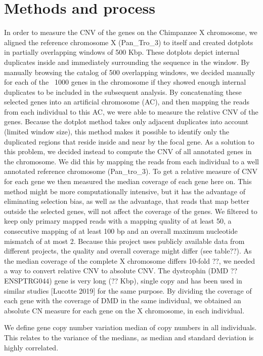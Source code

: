 \section*{Methods and process}
In order to measure the CNV of the genes on the Chimpanzee X chromosome, we aligned the reference chromosome X (Pan\_Tro\_3) to itself and created dotplots in partially overlapping windows of 500 Kbp. These dotplots depict internal duplicates inside and immediately surrounding the sequence in the window. By manually browsing the catalog of 500 overlapping windows, we decided manually for each of the ~1000 genes in the chromosome if they showed enough internal duplicates to be included in the subsequent analysis. By concatenating these selected genes into an artificial chromosome (AC), and then mapping the reads from each individual to this AC, we were able to measure the relative CNV of the genes. Because the dotplot method takes only adjacent duplicates into account (limited window size), this method makes it possible to identify only the duplicated regions that reside inside and near by the focal gene. As a solution to this problem, we decided instead to compute the CNV of all annotated genes in the chromosome. We did this by mapping the reads from each individual to a well annotated reference chromosome (Pan\_tro\_3). To get a relative measure of CNV for each gene we then measured the median coverage of each gene here on. This method might be more computationally intensive, but it has the advantage of eliminating selection bias, as well as the advantage, that reads that map better outside the selected genes, will not affect the coverage of the genes. We filtered to keep only primary mapped reads with a mapping quality of at least 50, a consecutive mapping of at least 100 bp and an overall maximum nucleotide mismatch of at most 2. Because this project uses publicly available data from different projects, the quality and overall coverage might differ (see table??). As the median coverage of the complete X chromosome differs 10-fold ??, we needed a way to convert relative CNV to absolute CNV. The dystrophin (DMD ??ENSPTRG{0}44) gene is very long (?? Kbp), single copy and has been used in similar studies [Lucotte 2019] for the same purpose. By dividing the coverage of each gene with the coverage of DMD in the same individual, we obtained an absolute CN measure for each gene on the X chromosome, in each individual. 

We define gene copy number variation median of copy numbers in all individuals. This relates to the variance of the medians, as median and standard deviation is highly correlated. 

